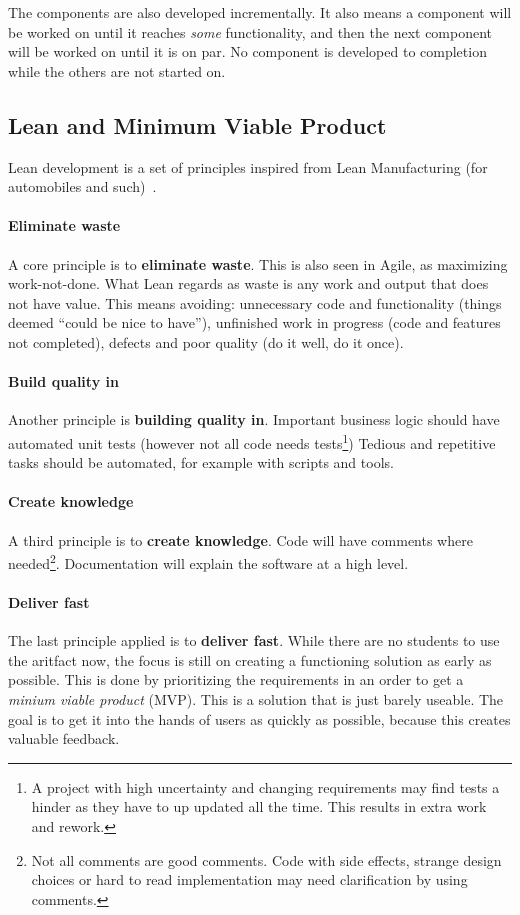 The components are also developed incrementally.
It also means a component will be worked on until it reaches \textit{some} functionality, and then the next component will be worked on until it is on par.
No component is developed to completion while the others are not started on.


\subsection{Lean and Minimum Viable Product}

Lean development is a set of principles inspired from Lean Manufacturing (for automobiles and such)~\cite{rachellelynnGuidingPrinciplesLean}.


\paragraph{Eliminate waste}
A core principle is to \textbf{eliminate waste}.
This is also seen in Agile, as maximizing work-not-done.
What Lean regards as waste is any work and output that does not have value.
This means avoiding: unnecessary code and functionality (things deemed ``could be nice to have''), unfinished work in progress (code and features not completed), defects and poor quality (do it well, do it once).


\paragraph{Build quality in}
Another principle is \textbf{building quality in}.
Important business logic should have automated unit tests (however not all code needs tests\footnote{A project with high uncertainty and changing requirements may find tests a hinder as they have to up updated all the time. This results in extra work and rework.})
Tedious and repetitive tasks should be automated, for example with scripts and tools.


\paragraph{Create knowledge}
A third principle is to \textbf{create knowledge}.
Code will have comments where needed\footnote{Not all comments are good comments. Code with side effects, strange design choices or hard to read implementation may need clarification by using comments.}.
Documentation will explain the software at a high level.


\paragraph{Deliver fast}
The last principle applied is to \textbf{deliver fast}.
While there are no students to use the aritfact now, the focus is still on creating a functioning solution as early as possible.
This is done by prioritizing the requirements in an order to get a \textit{minium viable product} (MVP).
This is a solution that is just barely useable.
The goal is to get it into the hands of users as quickly as possible, because this creates valuable feedback.

